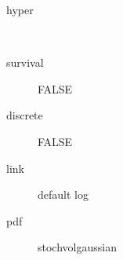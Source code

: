 \begin{description}
	\item[hyper]\ 
	 \item[ survival ] FALSE 
	 \item[ discrete ] FALSE 
	 \item[ link ] default log 
	 \item[ pdf ] stochvolgaussian 
\end{description}
